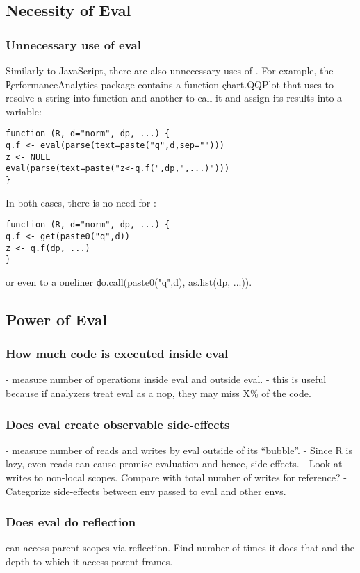 \documentclass[USenglish,cleveref, autoref, thm-restate]{lipics-v2019}
\begin{document}
\subsection{Necessity of Eval}

\subsubsection{Unnecessary use of eval}
  Similarly to JavaScript, there are also unnecessary uses of \eval.
  For example, the \c{PerformanceAnalytics} package contains a function
  \c{chart.QQPlot} that uses \eval to resolve a string into function and
  another to call it and assign its results into a variable:
\begin{lstlisting}
function (R, d="norm", dp, ...) {
q.f <- eval(parse(text=paste("q",d,sep="")))
z <- NULL
eval(parse(text=paste("z<-q.f(",dp,",...)")))
}
\end{lstlisting}
  In both cases, there is no need for \eval:
\begin{lstlisting}
function (R, d="norm", dp, ...) {
q.f <- get(paste0("q",d))
z <- q.f(dp, ...)
}
\end{lstlisting}
  or even to a oneliner \c{do.call(paste0("q",d), as.list(dp, ...))}.

\subsection{Power of Eval}

\subsubsection{How much code is executed inside eval}
- measure number of operations inside eval and outside eval.
- this is useful because if analyzers treat eval as a nop, they may miss X\% of the code.

\subsubsection{Does eval create observable side-effects}
- measure number of reads and writes by eval outside of its ``bubble''.
- Since R is lazy, even reads can cause promise evaluation and hence, side-effects.
- Look at writes to non-local scopes. Compare with total number of writes for
reference?
- Categorize side-effects between env passed to eval and other envs.

\subsubsection{Does eval do reflection}
\eval can access parent scopes via reflection. Find number of times it does that
and the depth to which it access parent frames.
\end{document}
